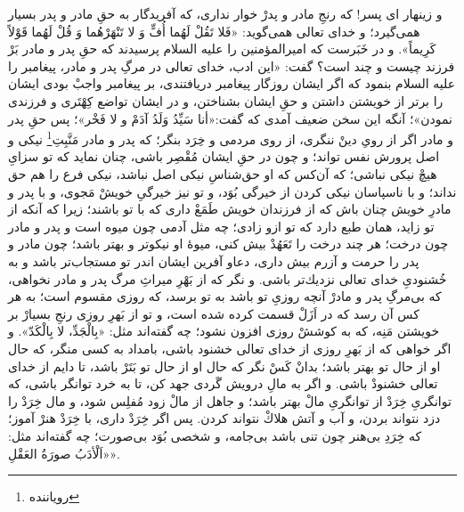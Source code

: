 و زينهار اى پسر! كه رنجِ مادر و پدرْ خوار ندارى، كه آفريدگار به حقِ مادر و پدر بسيار همى‌گيرد؛ و خداى تعالى همى‌گويد: «فَلا تَقُلْ لَهُما أُفٍّ وَ لا تَنْهَرْهُما وَ قُلْ لَهُما قَوْلاً كَرِيماً». و در خَبَرست كه اميرالمؤمنين را عليه السلام پرسيدند كه حقِ پدر و مادر بَرْ فرزند چيست و چند است‌؟ گفت: «اين ادب، خداى تعالى در مرگِ پدر و مادر، پيغامبر را عليه السلام بنمود كه اگر ايشان روزگار پيغامبر دريافتندى، بر پيغامبر واجبْ بودى ايشان را برتر از خويشتن داشتن و حقِ ايشان بشناختن، و در ايشان تواضع كِهْتَرى و فرزندى نمودن»؛ آنگه اين سخن ضعيف آمدى كه گفت:«أنا سَیِّدُ وَلَدُ آدَمْ و لا فَخْر»؛ پس حقِ پدر و مادر اگر از روىِ دينْ ننگرى، از روى مردمى و خِرَد بنگر؛ كه پدر و مادر مَنَّبِتِ\footnote{رویاننده}
 نيكى و اصل پرورش نفس تواند؛ و چون در حقِ ايشان مُقْصِر باشى، چنان نمايد كه تو سزاىِ هيچْ نيكى نباشى؛ كه آن‌كس كه او حق‌شناسِ نيكى اصل نباشد، نيكى فرع را هم حق نداند؛ و با ناسپاسان نيكى كردن از خيرگى بُوَد، و تو نيز خيرگىِ خويشْ مَجوى، و با پدر و مادرِ خويش چنان باش كه از فرزندان خويش طَمَعْ دارى كه با تو باشند؛ زيرا كه آنكه از تو زايد، همان طبع دارد كه تو ازو زادى؛ چه مثل آدمى چون ميوه است و پدر و مادر چون درخت؛ هر چند درخت را تَعَهُدْ بيش كنى، ميوۀ او نيكوتر و بهتر باشد؛ چون مادر و پدر را حرمت و آزرم بيش دارى، دعاو آفرين ايشان اندر تو مستجاب‌تر باشد و به خُشنودىِ خداى تعالى نزديك‌تر باشى. و نگر كه از بَهْرِ ميراثِ مرگ پدر و مادر نخواهى، كه بى‌مرگِ پدر و مادرْ آنچه روزىِ تو باشد به تو برسد، كه روزى مقسوم است؛ به هر كس آن رسد كه در اَزَلْ قسمت كرده شده است، و تو از بَهرِ روزى رنجِ بسيارْ بر خويشتن مَنِه، كه به كوششْ روزى افزون نشود؛ چه گفته‌اند مثل: «بِالْجَدِّ، لا بِالْكَدّ». و اگر خواهى كه از بَهرِ روزى از خداى تعالى خشنود باشى، بامداد به كسى منگر، كه حال او از حال تو بهتر باشد؛ بدانْ کَسْ نگر كه حال او از حال تو بَتَرْ باشد، تا دايم از خداى تعالى خشنودْ باشى. و اگر به مالِ درويش گَردى جهد كن، تا به خرد توانگر باشى، كه توانگریِ خِرَدْ از توانگرىِ مالْ بهتر باشد؛ و جاهل از مالْ زود مُفلِس شود، و مال خِرَدْ را دزد نتواند بردن، و آب و آتش هلاكْ نتواند كردن. پس اگر خِرَدْ دارى، با خِرَدْ هنرْ آموز؛ كه خِرَدِ بى‌هنر چون تنى باشد بى‌جامه، و شخصى بُوَد بى‌صورت؛ چه گفته‌اند مثل: «اَلْأدَبُ صورَةُ العَقْلِ».
\newpage